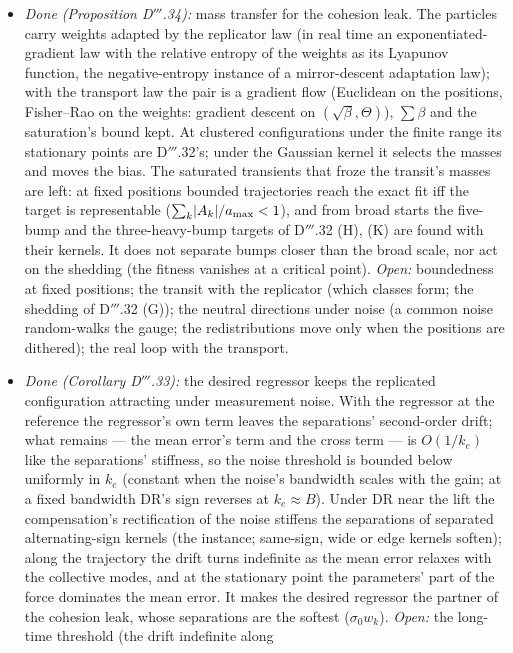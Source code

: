 \begin{enumerate}[label=\arabic*.,leftmargin=*]
\begin{itemize}
    \item \emph{Done (Proposition D$'''$.34):} mass transfer for the cohesion leak. The particles carry weights
      adapted by the replicator law (in real time an exponentiated-gradient law with the relative entropy of the
      weights as its Lyapunov function, the negative-entropy instance of a mirror-descent adaptation law); with the
      transport law the pair is a gradient flow (Euclidean on the positions, Fisher--Rao on the weights: gradient
      descent on $(\sqrt\beta,\Theta)$), $\sum\beta$ and the saturation's bound kept. At clustered configurations
      under the finite range its stationary points are D$'''$.32's; under the Gaussian kernel it selects the masses and
      moves the bias. The saturated transients that froze the transit's masses are left: at fixed positions bounded
      trajectories reach the exact fit iff the target is representable ($\sum_k\lvert A_k\rvert/a_{\max} < 1$), and from
      broad starts the five-bump and the three-heavy-bump targets of D$'''$.32 (H), (K) are found with their kernels.
      It does not separate bumps closer than the broad scale, nor act on the shedding (the fitness vanishes at a
      critical point). \emph{Open:} boundedness at fixed positions; the transit with the replicator (which classes
      form; the shedding of D$'''$.32 (G)); the neutral directions under noise (a common noise random-walks the gauge;
      the redistributions move only when the positions are dithered); the real loop with the transport.
    \item \emph{Done (Corollary D$'''$.33):} the desired regressor keeps the replicated configuration attracting under
      measurement noise. With the regressor at the reference the regressor's own term leaves the separations'
      second-order drift; what remains --- the mean error's term and the cross term --- is $O(1/k_e)$ like the
      separations' stiffness, so the noise threshold is bounded below uniformly in $k_e$ (constant when the noise's
      bandwidth scales with the gain; at a fixed bandwidth DR's sign reverses at $k_e\approx B$). Under DR near the
      lift the compensation's rectification of the noise stiffens the separations of separated alternating-sign
      kernels (the instance; same-sign, wide or edge kernels soften); along the trajectory the drift turns indefinite
      as the mean error relaxes with the collective modes, and at the stationary point the parameters' part of the
      force dominates the mean error. It makes the desired regressor the partner of the cohesion leak, whose
      separations are the softest ($\sigma_0w_k$). \emph{Open:} the long-time threshold (the drift indefinite along

\end{itemize}
\end{enumerate}
